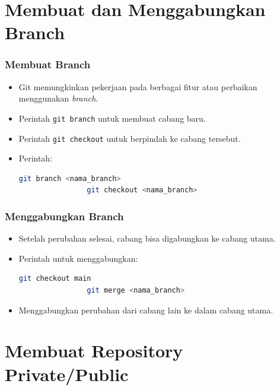 \documentclass[aspectratio=169, table]{beamer}
\begin{document}
	\section{Membuat dan Menggabungkan Branch}
	
	\begin{frame}[fragile]
		\frametitle{Membuat Branch}
		\begin{itemize}
			\item Git memungkinkan pekerjaan pada berbagai fitur atau perbaikan menggunakan \textit{branch}.
			\item Perintah \texttt{git branch} untuk membuat cabang baru.
			\item Perintah \texttt{git checkout} untuk berpindah ke cabang tersebut.
			\item Perintah:
			\begin{lstlisting}[language=bash]
				git branch <nama_branch>
				git checkout <nama_branch>
			\end{lstlisting}
		\end{itemize}
	\end{frame}
	
	\begin{frame}[fragile]
		\frametitle{Menggabungkan Branch}
		\begin{itemize}
			\item Setelah perubahan selesai, cabang bisa digabungkan ke cabang utama.
			\item Perintah untuk menggabungkan:
			\begin{lstlisting}[language=bash]
				git checkout main
				git merge <nama_branch>
			\end{lstlisting}
			\item Menggabungkan perubahan dari cabang lain ke dalam cabang utama.
		\end{itemize}
	\end{frame}
	
	\section{Membuat Repository Private/Public}
	
\end{document}
